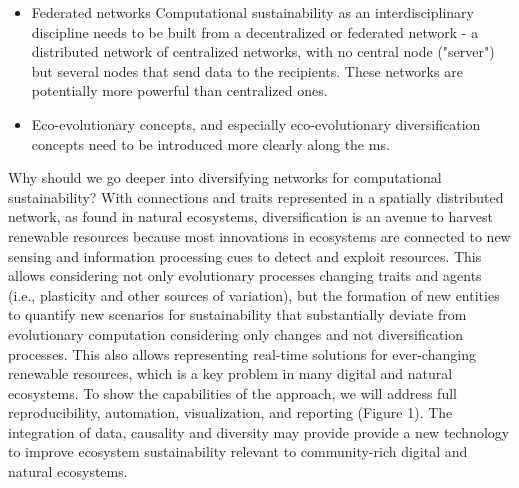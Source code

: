 \documentclass[12pt,a4paper]{article}
\begin{document}
\begin{itemize}
\item Federated networks
Computational sustainability as an interdisciplinary discipline needs to be built from a decentralized or federated network - a distributed network of centralized networks, with no central node ("server") but several nodes that send data to the recipients. These networks are potentially more powerful than centralized ones. 

\item Eco-evolutionary concepts, and especially eco-evolutionary diversification concepts need to be introduced more clearly along the ms.




\end{itemize}

Why should we go deeper into diversifying networks for computational sustainability? With connections and traits represented in a spatially distributed network, as found in natural ecosystems, diversification is an avenue to harvest renewable resources because most innovations in ecosystems are connected to new sensing and information processing cues to detect and exploit resources. This allows considering not only evolutionary processes changing traits and agents (i.e., plasticity and other sources of variation), but the formation of new entities to quantify new scenarios for sustainability that substantially deviate from evolutionary computation considering only changes and not diversification processes. This also allows representing real-time solutions for ever-changing renewable resources, which is a key problem in many digital and natural ecosystems. To show the capabilities of the approach, we will address full reproducibility, automation, visualization, and reporting (Figure 1). The integration of data, causality and diversity may provide provide a new technology to improve ecosystem sustainability relevant to community-rich digital and natural ecosystems.
\end{document}
